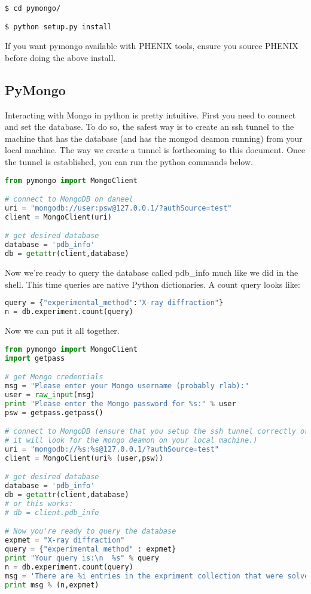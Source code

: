 \documentclass[12pt]{article}
\begin{document}
\noindent
\texttt{\$ cd pymongo/}

\noindent
\texttt{\$ python setup.py install}

\vspace{5mm}
\noindent
If you want pymongo available with PHENIX tools, ensure you source PHENIX before doing the above install.

\newpage
\subsection{PyMongo}
Interacting with Mongo in python is pretty intuitive.
First you need to connect and set the database.
To do so, the safest way is to create an ssh tunnel to the machine that has the database (and has the mongod deamon running) from your local machine.
The way we create a tunnel is forthcoming to this document.
Once the tunnel is established, you can run the python commands below.

\begin{lstlisting}[language=python]
from pymongo import MongoClient

# connect to MongoDB on daneel
uri = "mongodb://user:psw@127.0.0.1/?authSource=test"
client = MongoClient(uri)

# get desired database
database = 'pdb_info'
db = getattr(client,database)
\end{lstlisting}

\noindent
Now we're ready to query the database called pdb\_info much like we did in the shell.
This time queries are native Python dictionaries.
A count query looks like:

\begin{lstlisting}[language=python]
query = {"experimental_method":"X-ray diffraction"}
n = db.experiment.count(query)
\end{lstlisting}

\noindent
Now we can put it all together.

\begin{lstlisting}[language=python]
from pymongo import MongoClient
import getpass

# get Mongo credentials
msg = "Please enter your Mongo username (probably rlab):"
user = raw_input(msg)
print "Please enter the Mongo password for %s:" % user
psw = getpass.getpass()

# connect to MongoDB (ensure that you setup the ssh tunnel correctly or
# it will look for the mongo deamon on your local machine.)
uri = "mongodb://%s:%s@127.0.0.1/?authSource=test"
client = MongoClient(uri% (user,psw))

# get desired database
database = 'pdb_info'
db = getattr(client,database)
# or this works:
# db = client.pdb_info

# Now you're ready to query the database 
expmet = "X-ray diffraction"
query = {"experimental_method" : expmet}
print "Your query is:\n  %s" % query
n = db.experiment.count(query)
msg = 'There are %i entries in the expriment collection that were solved via %s'
print msg % (n,expmet)
\end{lstlisting}
\end{document}
